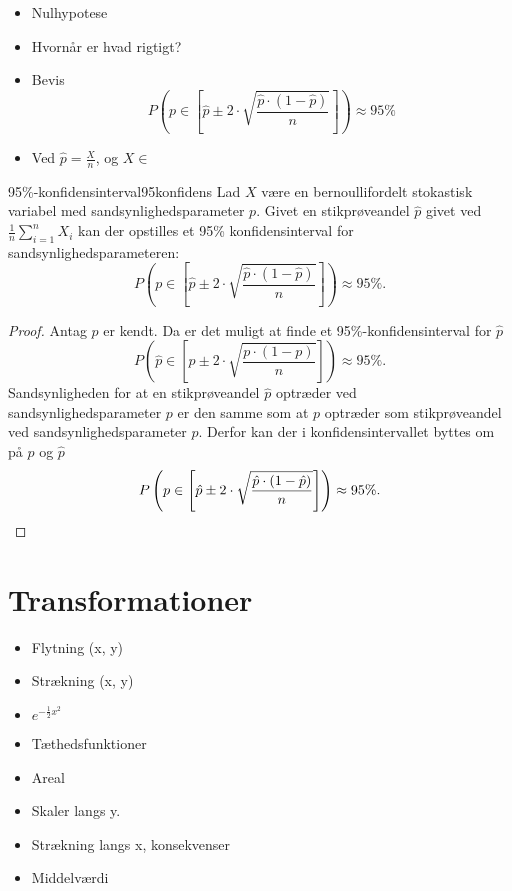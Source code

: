 \documentclass{article}
\begin{document}
\begin{itemize}
	\item Nulhypotese
	\item Hvornår er hvad rigtigt?
	\item Bevis
		\[
			P(p\in[\hat p \pm 2\cdot\sqrt{\frac{\hat p\cdot(1-\hat p)}{n}}]) \approx 95\%
		\]
	\item Ved $\hat p = \frac{X}{n}$, og $X \in $
\end{itemize}

\begin{theorem}{95\%-konfidensinterval}{95konfidens}
	Lad $X$ være en bernoullifordelt stokastisk variabel med
	sandsynlighedsparameter $p$. Givet en stikprøveandel $\hat{p}$ givet ved
	$\frac{1}{n}\sum_{i=1}^n X_i$ kan der opstilles et 95\% konfidensinterval
	for sandsynlighedsparameteren:
	\[
		P\left(p\in\left[\hat p \pm 2\cdot\sqrt{\frac{\hat p\cdot(1-\hat p)}{n}}\right]\right)
		\approx 95\%.
	\] 
\end{theorem}

\begin{proof}
	Antag $p$ er kendt. Da er det muligt at finde et 95\%-konfidensinterval for
	$\hat{p}$
	\[
		P\left(\hat{p}\in\left[p \pm 2\cdot\sqrt{\frac{p\cdot(1-p)}{n}}\right]\right)
		\approx 95\%.
	\] 
	Sandsynligheden for at en stikprøveandel $\hat{p}$ optræder ved
	sandsynlighedsparameter $p$ er den samme som at $p$ optræder som
	stikprøveandel ved sandsynlighedsparameter $\hat{p}$. Derfor kan der i
	konfidensintervallet byttes om på $p$ og $\hat{p}$
	\[
		P\left(p\in\left[\hat p \pm 2\cdot\sqrt{\frac{\hat p\cdot(1-\hat p)}{n}}\right]\right)
		\approx 95\%.\qedhere
	\] 
\end{proof}

\section{Transformationer}
\begin{itemize}
	\item Flytning (x, y)
	\item Strækning (x, y)
	\item $e^{-\frac{1}{2}x^2}$
	\item Tæthedsfunktioner
	\item Areal
	\item Skaler langs y.
	\item Strækning langs x, konsekvenser
	\item Middelværdi
\end{itemize}
\end{document}
